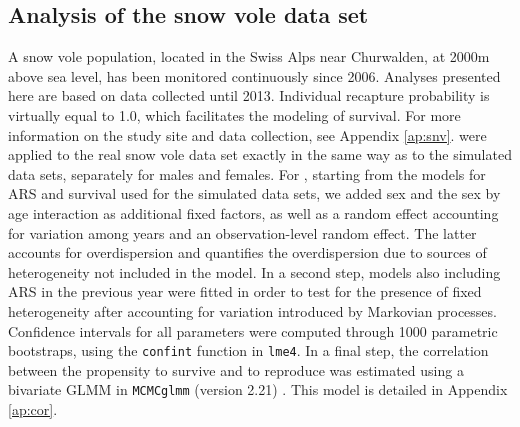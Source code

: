 \subsection{Analysis of the snow vole data set}

A snow vole population, located in the Swiss Alps near Churwalden, at 2000m above sea level, has been monitored continuously since 2006. Analyses presented here are based on data collected until 2013. Individual recapture probability is virtually equal to 1.0, which facilitates the modeling of survival. For more information on the study site and data collection, see Appendix \ref{ap:snv}. \NSM were applied to the real snow vole data set exactly in the same way as to the simulated data sets, separately for males and females.
For \MM, starting from the models for ARS and survival used for the simulated data sets, we added sex and the sex by age interaction as additional fixed factors, as well as a random effect accounting for variation among years and an observation-level random effect. The latter accounts for overdispersion \parencite[see e.g.][]{Atkins2013} and quantifies the overdispersion due to sources of heterogeneity not included in the model.
In a second step, models also including ARS in the previous year were fitted in order to test for the presence of fixed heterogeneity after accounting for variation introduced by Markovian processes. Confidence intervals for all parameters were computed through 1000 parametric bootstraps, using the \verb+confint+ function in \verb+lme4+. In a final step, the correlation between the propensity to survive and to reproduce was estimated using a bivariate GLMM in \verb+MCMCglmm+ (version 2.21) \parencite{Hadfield2010}. This model is detailed in Appendix \ref{ap:cor}.

